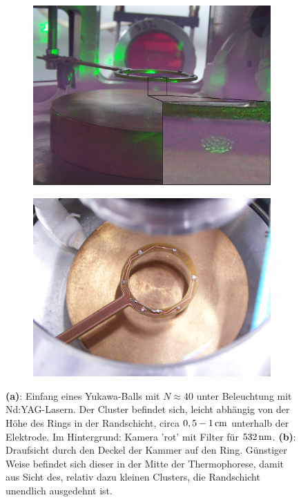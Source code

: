 \documentclass[numbers=noenddot,a4paper,notitlepage,twoside,BCOR15mm]{scrbook}
\newcommand{\fett}[1]{\textbf{#1}}
\begin{document}
				\begin{figure}[!t]
					\begin{subfigure}[t]{0.48\textwidth}
						\centering
						\includegraphics[width=\textwidth,height=0.75\textwidth]{figs/cam/innenansicht.jpg}
						\caption{}
						\label{img:eingefangenerball}
					\end{subfigure}
					\begin{subfigure}[t]{0.48\textwidth}
						\centering
						\includegraphics[width=\textwidth,height=0.75\textwidth]{figs/cam/topview.jpg}
						\caption{}
						\label{img:topview}
					\end{subfigure}
					\caption{\fett{(a)}: Einfang eines Yukawa-Balls mit $N\approx40$ unter Beleuchtung mit Nd:YAG-Lasern. Der Cluster befindet sich, leicht abhängig von der Höhe des Rings in der Randschicht, circa $\unit[0,5-1]{cm} $ unterhalb der Elektrode. Im Hintergrund: Kamera 'rot' mit Filter für $\unit[532]{nm}$. \fett{(b)}: Draufsicht durch den Deckel der Kammer auf den Ring. Günstiger Weise befindet sich dieser in der Mitte der Thermophorese, damit aus Sicht des, relativ dazu kleinen Clusters, die Randschicht unendlich ausgedehnt ist.}
				\end{figure}
\end{document}
